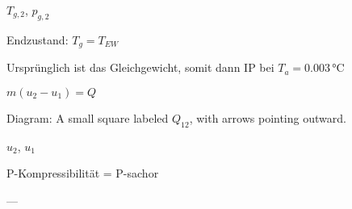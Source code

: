 \( T_{g,2} \), \( p_{g,2} \)  

Endzustand: \( T_g = T_{EW} \)  

Ursprünglich ist das Gleichgewicht, somit dann IP bei \( T_a = 0.003 \, \text{°C} \)  

\( m (u_2 - u_1) = Q \)  

Diagram:  
A small square labeled \( Q_{12} \), with arrows pointing outward.  

\( u_2 \), \( u_1 \)  

P-Kompressibilität = P-sachor  

---